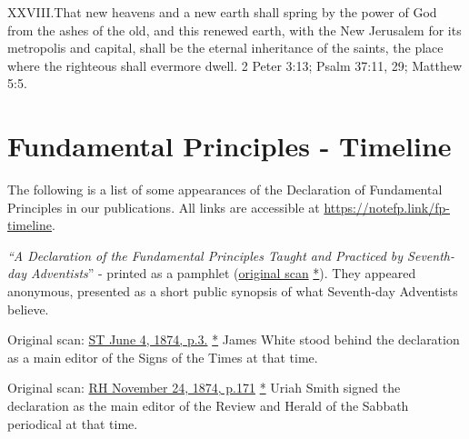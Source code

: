 \lettrine{XXVIII.} That new heavens and a new earth shall spring by the power of God from the ashes of the old, and this renewed earth, with the New Jerusalem for its metropolis and capital, shall be the eternal inheritance of the saints, the place where the righteous shall evermore dwell. 2 Peter 3:13; Psalm 37:11, 29; Matthew 5:5. 



\section*{Fundamental Principles - Timeline} \label{appendix:timeline}

The following is a list of some appearances of the Declaration of Fundamental Principles in our publications. All links are accessible at \href{https://notefp.link/fp-timeline}{https://notefp.link/fp-timeline}.


\textit{“A Declaration of the Fundamental Principles Taught and Practiced by Seventh-day Adventists}” - printed as a pamphlet (\href{https://adventistdigitallibrary.org/islandora/object/adl:366607?link_only=true}{original scan} \href{https://forgotten-pillar.s3.us-east-2.amazonaws.com/A+declaration+of+the+fundamental+principles+taught+and+practiced+by+the+Seventh-day+Adventists++.pdf}{*}). They appeared anonymous, presented as a short public synopsis of what Seventh-day Adventists believe.


Original scan: \href{https://adventistdigitallibrary.org/adl-364148/signs-times-june-4-1874}{ST June 4, 1874, p.3.} \href{https://forgotten-pillar.s3.us-east-2.amazonaws.com/Signs+of+the+Times+_+June+4%2C+1874++.pdf}{*} James White stood behind the declaration as a main editor of the Signs of the Times at that time.


Original scan: \href{https://documents.adventistarchives.org/Periodicals/RH/RH18741124-V44-22.pdf}{RH November 24, 1874, p.171} \href{https://forgotten-pillar.s3.us-east-2.amazonaws.com/RH18741124-V44-22.pdf}{*} Uriah Smith signed the declaration as the main editor of the Review and Herald of the Sabbath periodical at that time.


